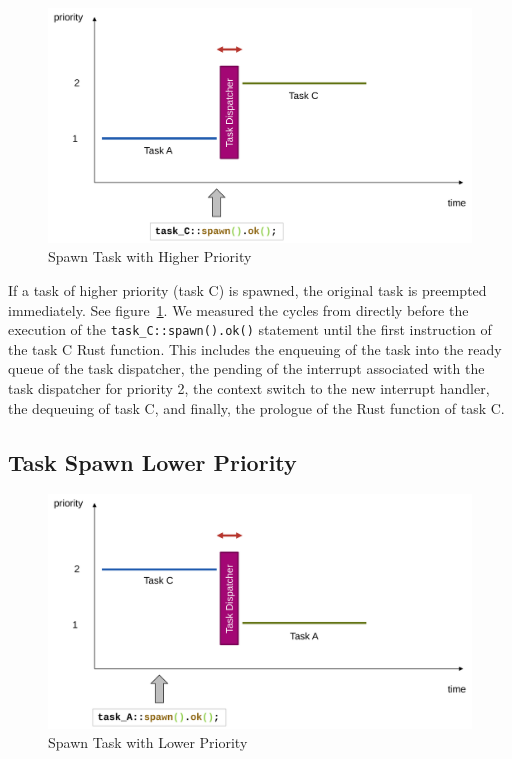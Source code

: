 \begin{figure}
  \centerfloat
  \includegraphics[width=\textwidth]{fig/spawn_prio_high.svg.pdf}
  \caption{Spawn Task with Higher Priority}%
  \label{fig:spawn_prio_high}
\end{figure}

If a task of higher priority (task C) is spawned, the original task is preempted immediately. See figure~\ref{fig:spawn_prio_high}.
We measured the cycles from directly before the execution of the \texttt{task_C::spawn().ok()} statement until the first instruction of the task C Rust function.
This includes the enqueuing of the task into the ready queue of the task dispatcher, the pending of the interrupt associated with the task dispatcher for priority 2, the context switch to the new interrupt handler, the dequeuing of task C, and finally, the prologue of the Rust function of task C.

\subsection{Task Spawn Lower Priority}

\begin{figure}
  \centerfloat
  \includegraphics[width=\textwidth]{fig/spawn_prio_low.svg.pdf}
  \caption{Spawn Task with Lower Priority}%
  \label{fig:spawn_prio_low}
\end{figure}


